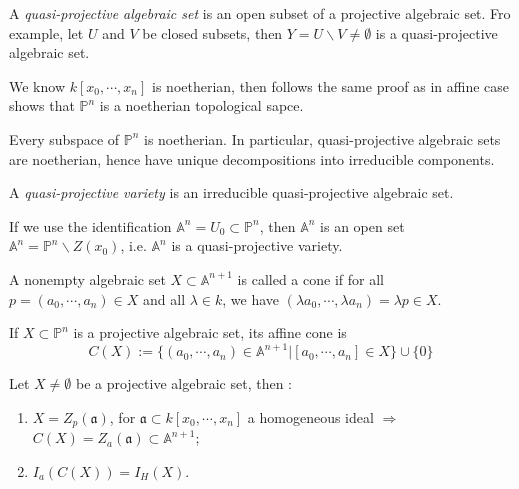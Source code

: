 \begin{definition}
	A \textit{quasi-projective algebraic set} is an open subset of a projective algebraic set. Fro example, let $ U $ and $ V $ be closed subsets, then $ Y=U\backslash V\neq \emptyset $ is a quasi-projective algebraic set.
\end{definition}
\begin{proposition}
	We know $ k[x_0,\cdots,x_n] $ is noetherian, then follows the same proof as in affine case shows that $ \mathbb{P}^n $ is a noetherian topological sapce.
\end{proposition}
\begin{remark}
	Every subspace of $ \mathbb{P}^n $ is noetherian. In particular, quasi-projective algebraic sets are noetherian, hence have unique decompositions into irreducible components.
\end{remark}
\begin{definition}
	A \textit{quasi-projective variety} is an irreducible quasi-projective algebraic set.
\end{definition}
\begin{remark}
	If we use the identification $ \mathbb{A}^n=U_0\subset \mathbb{P}^n $, then $ \mathbb{A}^n $ is an open set $ \mathbb{A}^n=\mathbb{P}^n\backslash Z(x_0) $, i.e. $ \mathbb{A}^n $ is a quasi-projective variety.
\end{remark}
\begin{definition}
	A nonempty algebraic set $ X\subset \mathbb{A}^{n+1} $ is called a cone if for all $ p=(a_0,\cdots,a_n)\in X $ and all $ \lambda \in k $, we have $ (\lambda a_0,\cdots,\lambda a_n)=\lambda p\in X $.

	If $ X\subset \mathbb{P}^n $ is a projective algebraic set, its affine cone is
	\begin{equation}
		C(X):=\{ (a_0,\cdots,a_n)\in \mathbb{A}^{n+1}|[a_0,\cdots,a_n]\in X \}\cup\{ 0 \}
	\end{equation}
\end{definition}
\begin{lemma}
	Let $ X\neq\emptyset $ be a projective algebraic set, then :
	\begin{enumerate}
		\item $ X=Z_p(\mathfrak{a}) $, for $ \mathfrak{a}\subset k[x_0,\cdots,x_n]$ a   homogeneous ideal $ \Rightarrow $ $ C(X)=Z_a(\mathfrak{a})\subset \mathbb{A}^{n+1} $;
		\item $ I_a(C(X))=I_H(X) $.
	\end{enumerate}
\end{lemma}
